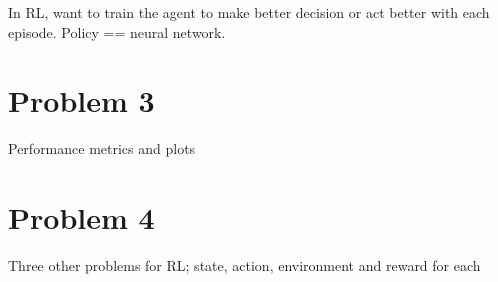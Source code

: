 \documentclass{article}
\numberwithin{equation}{section}
\numberwithin{equation}{section}
\begin{document}
In RL, want to train the agent to make better decision or act better with each episode. Policy == neural network. 





\section{Problem 3}
Performance metrics and plots








\section{Problem 4}
Three other problems for RL; state, action, environment and reward for each


\begin{comment}
\begin{figure}
	\centering
	\hspace*{-3.0cm}
	\texttt{[image: Q4.2M.png]}
	\\	
	\textbf{Fig.7:} Comparator for 3-bit signed integers, $a=-2=[1,1,0]$
	\\
	\label{fig:Fig.7}
\end{figure}
\end{comment}
\end{document}

